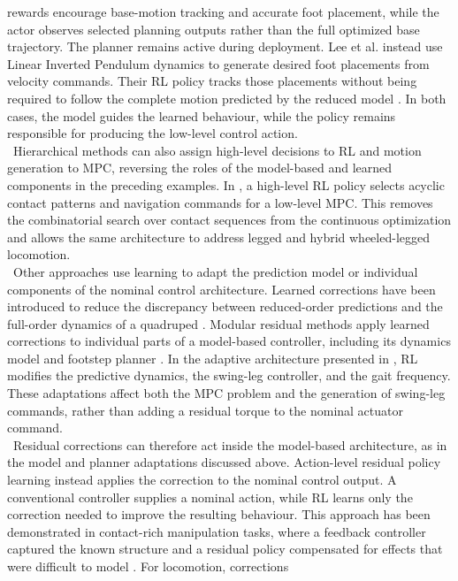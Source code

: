 rewards encourage base-motion tracking and accurate foot placement, while the
actor observes selected planning outputs rather than the full optimized base
trajectory. The planner remains active during deployment.
Lee et al. instead use Linear Inverted Pendulum dynamics
to generate desired foot placements from velocity commands. Their RL policy
tracks those placements without being required to follow the complete motion
predicted by the reduced model \cite{footstep_rl}. In both cases, the model
guides the learned behaviour, while the policy remains responsible for
producing the low-level control action.\\
\
Hierarchical methods  can also assign high-level decisions to RL and motion generation
to MPC, reversing the roles of the model-based and learned components in the
preceding examples. In
\cite{non_gaited}, a high-level RL policy selects acyclic contact patterns and
navigation commands for a low-level MPC. This removes the combinatorial search
over contact sequences from the continuous optimization and allows the same
architecture to address legged and hybrid wheeled-legged locomotion.\\
\
Other approaches use learning to adapt the prediction model or individual
components of the nominal control architecture. Learned corrections have been introduced
to reduce the
discrepancy between reduced-order predictions and the full-order dynamics of a
quadruped \cite{model_gap}. Modular residual methods apply learned corrections
to individual parts of a model-based controller, including its dynamics model
and footstep planner \cite{modular_residual}. In the adaptive architecture
presented in \cite{adaptive_mpc}, RL modifies the predictive dynamics, the
swing-leg controller, and the gait frequency. These adaptations affect both
the MPC problem and the generation of swing-leg commands, rather than adding
a residual torque to the nominal actuator command.\\
\
Residual corrections can therefore act inside the model-based architecture,
as in the model and planner adaptations discussed above. Action-level residual
policy learning instead applies the correction to the nominal control output. A
conventional
controller supplies a nominal action, while RL learns only the correction
needed to improve the resulting behaviour. This approach has been demonstrated
in contact-rich manipulation tasks, where a feedback controller captured the
known structure and a residual policy compensated for effects that were
difficult to model \cite{residual_robot_control}. For locomotion, corrections
